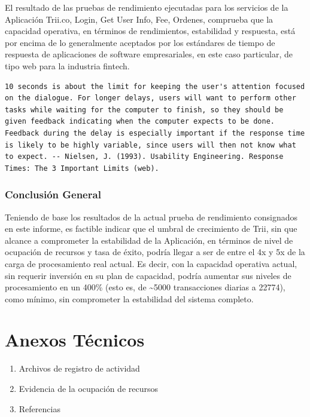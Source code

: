 \documentclass[
  paper=a4,
  ,captions=tableheading
]{scrartcl}
\providecommand{\tightlist}{%
  \setlength{\itemsep}{0pt}\setlength{\parskip}{0pt}}
\begin{document}
El resultado de las pruebas de rendimiento ejecutadas para los servicios
de la Aplicación Trii.co, Login, Get User Info, Fee, Ordenes, comprueba
que la capacidad operativa, en términos de rendimientos, estabilidad y
respuesta, está por encima de lo generalmente aceptados por los
estándares de tiempo de respuesta de aplicaciones de software
empresariales, en este caso particular, de tipo web para la industria
fintech.

\begin{verbatim}
10 seconds is about the limit for keeping the user's attention focused on the dialogue. For longer delays, users will want to perform other tasks while waiting for the computer to finish, so they should be given feedback indicating when the computer expects to be done. Feedback during the delay is especially important if the response time is likely to be highly variable, since users will then not know what to expect. -- Nielsen, J. (1993). Usability Engineering. Response Times: The 3 Important Limits (web).
\end{verbatim}

\subsubsection{Conclusión General}\label{sec:conclusiuxf3n-general}

Teniendo de base los resultados de la actual prueba de rendimiento
consignados en este informe, es factible indicar que el umbral de
crecimiento de Trii, sin que alcance a comprometer la estabilidad de la
Aplicación, en términos de nivel de ocupación de recursos y tasa de
éxito, podría llegar a ser de entre el 4x y 5x de la carga de
procesamiento real actual. Es decir, con la capacidad operativa actual,
sin requerir inversión en su plan de capacidad, podría aumentar sus
niveles de procesamiento en un 400\% (esto es, de \textasciitilde5000
transacciones diarias a 22774), como mínimo, sin comprometer la
estabilidad del sistema completo.

\newpage

\section{Anexos Técnicos}\label{sec:anexos-tuxe9cnicos}

\begin{enumerate}
\def\labelenumi{\arabic{enumi}.}
\tightlist
\item
  Archivos de registro de actividad
\item
  Evidencia de la ocupación de recursos
\item
  Referencias
\end{enumerate}
\end{document}
